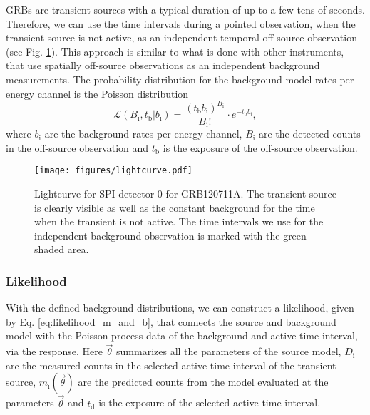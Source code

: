 \documentclass[twocolumn,traditabstract]{aa}
\begin{document}
GRBs are transient sources with a typical duration of up to a few tens of seconds. Therefore, we can use the time intervals during a pointed observation, when the transient source is not active, as an independent temporal off-source observation (see Fig. \ref{fig:lightcurve}). This approach is similar to what is done with other instruments, that use spatially off-source observations as an independent background measurements. The probability distribution for the background model rates per energy channel is the Poisson distribution
\begin{equation}
	\mathcal{L}(B_{\mathrm{i}}, t_{\mathrm{b}}|b_{\mathrm{i}})=\frac{(t_{\mathrm{b}} b_{\mathrm{i}})^{B_{\mathrm{i}}}}{B_{\mathrm{i}}!}\cdot e^{-t_{\mathrm{b}} b_{\mathrm{i}}},
  \label{eq:poisson_bkg}
\end{equation}
where $b_{\mathrm{i}}$ are the background rates per energy channel, $B_{\mathrm{i}}$ are the detected counts in the off-source observation and $t_{\mathrm{b}}$ is the exposure of the off-source observation.
\begin{figure}
    \begin{centering}
        \texttt{[image: figures/lightcurve.pdf]}
        \caption{Lightcurve for SPI detector 0 for GRB120711A. The transient source is clearly visible as well as the constant background for the time when the transient is not active. The time intervals we use for the independent background observation is marked with the green shaded area.}
        \label{fig:lightcurve}
    \end{centering}
\end{figure}



\subsubsection{Likelihood}

With the defined background distributions, we can construct a likelihood, given by Eq. \ref{eq:likelihood_m_and_b}, that connects the source and background model with the Poisson process data of the background and active time interval, via the response. Here $\vec{\theta}$ summarizes all the parameters of the source model, $D_{\mathrm{i}}$ are the measured counts in the selected active time interval of the transient source, $m_{\mathrm{i}}(\vec{\theta})$ are the predicted counts from the model evaluated at the parameters $\vec{\theta}$ and $t_{\mathrm{d}}$ is the exposure of the selected active time interval.
\end{document}
